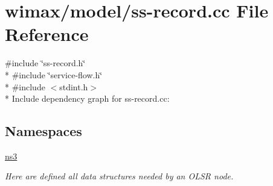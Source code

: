 \hypertarget{ss-record_8cc}{}\section{wimax/model/ss-\/record.cc File Reference}
\label{ss-record_8cc}
{\ttfamily \#include \char`\"{}ss-\/record.\+h\char`\"{}}\\*
{\ttfamily \#include \char`\"{}service-\/flow.\+h\char`\"{}}\\*
{\ttfamily \#include $<$stdint.\+h$>$}\\*
Include dependency graph for ss-\/record.cc\+:
\subsection*{Namespaces}
\begin{DoxyCompactItemize}
\item 
 \hyperlink{namespacens3}{ns3}
\begin{DoxyCompactList}\small\item\em Here are defined all data structures needed by an O\+L\+SR node. \end{DoxyCompactList}\end{DoxyCompactItemize}
